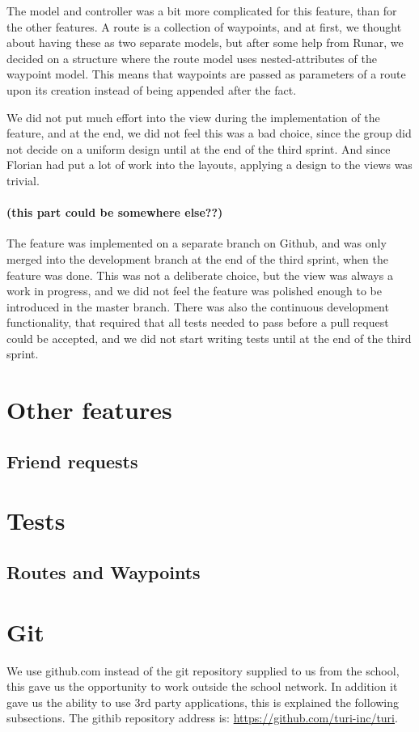 \documentclass[a4paper]{article}
\begin{document}
The model and controller was a bit more complicated for this feature, than for the other features. A route is a collection of waypoints, and at first, we thought about having these as two separate models,  but after some help from Runar, we decided on a structure where the route model uses nested-attributes of the waypoint model. This means that waypoints are passed as parameters of a route upon its creation instead of being appended after the fact.


\noindent
We did not put much effort into the view during the implementation of the feature, and at the end, we did not feel this was a bad choice, since the group did not decide on a uniform design until at the end of the third sprint. And since Florian had put a lot of work into the layouts, applying a design to the views was trivial.\\

\noindent
\paragraph{(this part could be somewhere else??)}The feature was implemented on a separate branch on Github, and was only merged into the development branch at the end of the third sprint, when the feature was done. This was not a deliberate choice, but the view was always a work in progress, and we did not feel the feature was polished enough to be introduced in the master branch. There was also the continuous development functionality, that required that all tests needed to pass before a pull request could be accepted, and we did not start writing tests until at the end of the third sprint. 

\section{Other features}
\subsection{Friend requests}

\section{Tests}
\subsection{Routes and Waypoints}


\section{Git}
We use github.com instead of the git repository supplied to us from the school, this gave us the opportunity to work outside the school network. In addition it gave us the ability to use 3rd party applications, this is explained the following subsections. The githib repository address is: \url{https://github.com/turi-inc/turi}.
\end{document}
